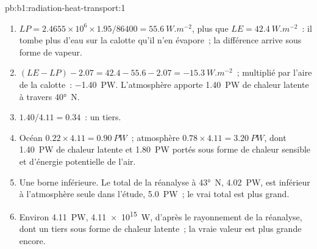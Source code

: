 \begin{solution}{pb:b1:radiation-heat-transport:1}
\begin{enumerate}
  \item $LP = 2.4655\times10^6 \times 1.95/86400 = \qty{55.6}{W.m^{-2}}$, plus que
        $LE = \qty{42.4}{W.m^{-2}}$~: il tombe plus d'eau sur la calotte qu'il n'en
        évapore~; la différence arrive sous forme de vapeur.
  \item $(LE - LP) - 2.07 = 42.4 - 55.6 - 2.07 = \qty{-15.3}{W.m^{-2}}$~; multiplié par
        l'aire de la calotte~: \qty{-1.40}{PW}. L'atmosphère apporte \qty{1.40}{PW}
        de chaleur latente à travers \ang{40}~N.
  \item $1.40/4.11 = 0.34$~: un tiers.
  \item Océan $0.22 \times 4.11 = \qty{0.90}{PW}$~; atmosphère $0.78 \times 4.11 =
        \qty{3.20}{PW}$, dont \qty{1.40}{PW} de chaleur latente et \qty{1.80}{PW}
        portés sous forme de chaleur sensible et d'énergie potentielle de l'air.
  \item Une borne inférieure. Le total de la réanalyse à \ang{43}~N, \qty{4.02}{PW}, est inférieur à
        l'atmosphère seule dans l'étude, \qty{5.0}{PW}~; le vrai total est
        plus grand.
  \item Environ \qty{4.11}{PW}, \qty{4.11e15}{W}, d'après le rayonnement de la
        réanalyse, dont un tiers sous forme de chaleur latente~; la vraie valeur est plus grande encore.
\end{enumerate}
\end{solution}
